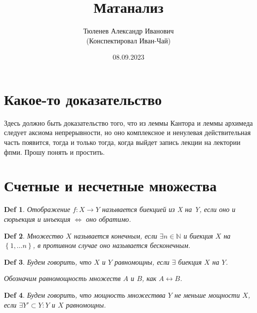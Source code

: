 \documentclass[a5paper, 10pt]{article}
\theoremstyle{plain}
\newtheorem{definition}{Def}
\newcommand{\N}{\mathbb N}
\newcommand{\lrarrow}{\leftrightarrow}
\newcommand{\Lrarrow}{\Leftrightarrow}
\begin{document}
	\author{Тюленев Александр Иванович\\(Конспектировал Иван-Чай)}
	\date{08.09.2023}
	\title{Матанализ}

	\linespread{1.4}
	\selectfont

	\maketitle
	\newpage

	\tableofcontents

	\section{Какое-то доказательство}

	Здесь должно быть доказательство того, что из леммы Кантора и леммы архимеда следует
	аксиома непрерывности, но оно комплексное и ненулевая действительная часть появится,
	тогда и только тогда, когда выйдет запись лекции на лектории фпми. Прошу понять и простить.

	\section{Счетные и несчетные множества}

	\begin{definition}
		Отображение $ f: X \rightarrow Y $ называется биекцией из X на Y, если оно
		и сюрьекция и инъекция $ \Lrarrow $ оно обратимо.
	\end{definition}

	\begin{definition}
		Множество $ X $ называется конечным, если $ \exists n \in \N $ и биекция
		$ X $ на $ \left\{ 1, \dots n \right\} $, в противном случае оно называется
		бесконечным.
	\end{definition}

	\begin{definition}
		Будем говорить, что $ X $ и $ Y $ равномощны, если $ \exists $ биекция $ X $ на $ Y $.

		Обозначим равномощность множеств $ A $ и $ B $, как $ A \lrarrow B $.
	\end{definition}


	\begin{definition}
		Будем говорить, что мощность множествва $ Y $ не меньше мощности $ X $, если
		$ \exists Y' \subset Y: Y $ и $ X $ равномощны.
	\end{definition}
\end{document}
